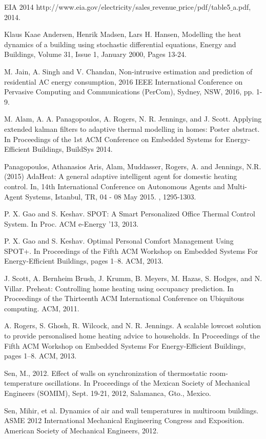 \documentclass{sig-alternate}
\begin{document}
\begin{thebibliography}{9}
 EIA 2014  http://www.eia.gov/electricity/sales$\_$revenue$\_$price/pdf/table5$\_$a.pdf, 2014. 
  
 Klaus Kaae Andersen, Henrik Madsen, Lars H. Hansen, Modelling the heat dynamics of a building using stochastic differential equations, Energy and Buildings, Volume 31, Issue 1, January 2000, Pages 13-24.


 M. Jain, A. Singh and V. Chandan, Non-intrusive estimation and prediction of residential AC energy consumption, 2016 IEEE International Conference on Pervasive Computing and Communications (PerCom), Sydney, NSW, 2016, pp. 1-9.


  M. Alam, A. A. Panagopoulos, A. Rogers, N. R. Jennings, and J. Scott. Applying extended kalman filters to adaptive thermal modelling in homes: Poster abstract. In Proceedings of the 1st ACM Conference on Embedded Systems for Energy-Efficient Buildings, BuildSys 2014.

 Panagopoulos, Athanasios Aris, Alam, Muddasser, Rogers, A. and Jennings, N.R.  (2015)  AdaHeat: A general adaptive intelligent agent for domestic heating control. In,  14th International Conference on Autonomous Agents and Multi-Agent Systems,  Istanbul, TR,  04 - 08 May 2015.  , 1295-1303.     

 P. X. Gao and S. Keshav. SPOT: A Smart Personalized Office Thermal Control System. In Proc. ACM e-Energy ’13, 2013.

 P. X. Gao and S. Keshav. Optimal Personal Comfort Management Using SPOT+. In Proceedings of the Fifth ACM Workshop on Embedded Systems For Energy-Efficient Buildings, pages 1–8. ACM, 2013. 

 J. Scott, A. Bernheim Brush, J. Krumm, B. Meyers, M. Hazas, S. Hodges, and N. Villar. Preheat: Controlling home heating using occupancy prediction. In Proceedings of the Thirteenth ACM International Conference on Ubiquitous computing. ACM, 2011.

 A. Rogers, S. Ghosh, R. Wilcock, and N. R. Jennings. A scalable lowcost solution to provide personalised home heating advice to households. In Proceedings of the Fifth ACM Workshop on Embedded Systems For Energy-Efficient Buildings, pages 1–8. ACM, 2013.

 Sen, M., 2012. Effect of walls on synchronization of thermostatic room-temperature oscillations. In Proceedings of the Mexican Society of Mechanical Engineers (SOMIM), Sept. 19-21, 2012, Salamanca, Gto., Mexico. 

  Sen, Mihir, et al. Dynamics of air and wall temperatures in multiroom buildings. ASME 2012 International Mechanical Engineering Congress and Exposition. American Society of Mechanical Engineers, 2012.


\end{thebibliography}
\end{document}
